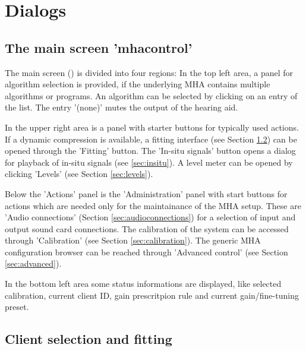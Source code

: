 \documentclass[11pt,a4paper,twoside]{article}
\newcommand{\+}{\discretionary{\mbox{\scriptsize$\hookleftarrow$}}{}{}}
\begin{document}
\section{Dialogs}

\subsection{The main screen 'mhacontrol'}

The main screen () is divided into four regions:
%
In the top left area, a panel for algorithm selection is provided, if the underlying
MHA contains multiple algorithms or programs.
%
An algorithm can
be selected by clicking on an entry of the list.
%
The entry '(none)' mutes the output of the hearing aid.

In the upper right area is a panel with starter buttons for typically
used actions.
%
If a dynamic compression is available, a fitting interface (see
Section \ref{sec:fitting}) can be opened through the 'Fitting' button.
%
The 'In-situ signals' button opens a dialog for playback of in-situ
signals (see \ref{sec:insitu}).
%
A level meter can be opened by clicking 'Levels' (see Section
\ref{sec:levels}).

Below the 'Actions' panel is the 'Administration'
panel with start buttons for actions which are
needed only for the maintainance of the MHA setup.
%
These are 'Audio connections' (Section \ref{sec:audioconnections}) for
a selection of input and output sound card connections.
%
The calibration of the system can be accessed through 'Calibration'
(see Section \ref{sec:calibration}).
%
The generic MHA configuration browser can be reached through 'Advanced
control' (see Section \ref{sec:advanced}).

In the bottom left area some status informations are displayed, like selected
calibration, current client ID,
gain prescritpion rule and current gain/fine-tuning
preset.


\subsection{Client selection and fitting}\label{sec:fitting}
\end{document}
